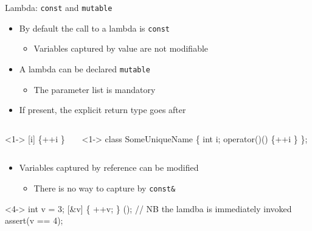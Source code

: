 \begin{frame}[fragile]{Lambda: \texttt{const} and \texttt{mutable}}
  \begin{itemize}
  \item By default the call to a lambda is \texttt{const}
    \begin{itemize}
    \item Variables captured by value are not modifiable
    \end{itemize}
  \item<2-> A lambda can be declared \texttt{mutable}
    \begin{itemize}
    \item The parameter list is mandatory
    \end{itemize}
  \item<3-> If present, the explicit return type goes after 
  \end{itemize}

  \begin{columns}[T]
    \begin{column}{.5\textwidth}
      \begin{codeblock}<1->{
[i] \{\ddd ++i \ddd\}}\end{codeblock}
    \end{column}

    \begin{column}{.5\textwidth}
      \begin{codeblock}<1->{
class SomeUniqueName \{
  int i;
  \ddd
   operator()() \{\ddd ++i \ddd\}
\};}\end{codeblock}
    \end{column}
  \end{columns}

  \begin{itemize}
  \item<4-> Variables captured by reference can be modified
    \begin{itemize}
    \item There is no way to capture by \texttt{const\&}
    \end{itemize}
  \end{itemize}

  \begin{codeblock}<4->
int v = 3;
[\&v] \{ ++v; \} (); // NB the lamdba is immediately invoked
assert(v == 4);\end{codeblock}

\end{frame}

